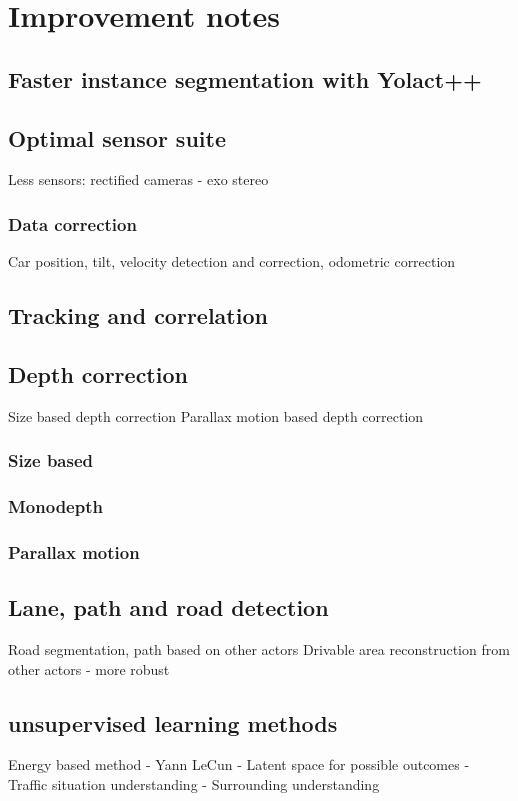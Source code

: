\chapter{Improvement notes}
\label{chap:improvement}
\section{Faster instance segmentation with Yolact++}

\section{Optimal sensor suite}
Less sensors: rectified cameras - exo stereo
\subsection{Data correction}
Car position, tilt, velocity detection and correction, odometric correction
\section{Tracking and correlation}
\section{Depth correction}
Size based depth correction
Parallax motion based depth correction
\subsection{Size based}
\subsection{Monodepth}
\subsection{Parallax motion}
\section{Lane, path and road detection}
Road segmentation, path  based on other actors
Drivable area reconstruction from other actors - more robust
\section{unsupervised learning methods}
Energy based method - Yann LeCun
  - Latent space for possible outcomes
  - Traffic situation understanding
  - Surrounding understanding
